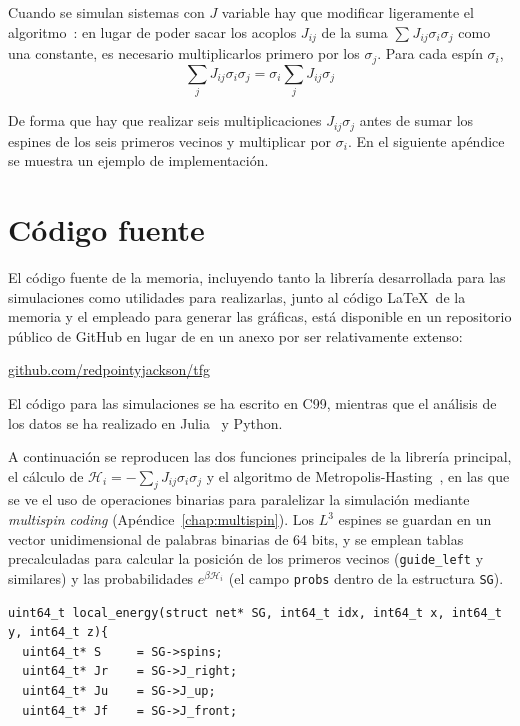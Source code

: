 \documentclass[11pt]{report}
\newcommand{\Ham}{\mathscr{H}}
\begin{document}
\begin{appendices}
Cuando se simulan sistemas con $J$ variable hay que modificar
ligeramente el algoritmo~\cite{multispincoding}: en lugar de poder
sacar los acoplos $J_{ij}$ de la suma $\sum_{} J_{ij}σ_iσ_j$ como una
constante, es necesario multiplicarlos primero por los $σ_j$. Para
cada espín $σ_i$,
\begin{equation}
  \sum_{j} J_{ij} σ_i σ_j = σ_i \sum_{j} J_{ij} σ_j
\end{equation}

De forma que hay que realizar seis multiplicaciones $J_{ij}σ_j$ antes
de sumar los espines de los seis primeros vecinos y multiplicar por
$σ_i$. En el siguiente apéndice se muestra un ejemplo de implementación.

\chapter{Código fuente}
El código fuente de la memoria, incluyendo tanto la librería
desarrollada para las simulaciones como utilidades para realizarlas,
junto al código \LaTeX \ de la memoria y el empleado para generar las
gráficas, está disponible en un repositorio público de GitHub
en lugar de en un anexo por ser relativamente extenso:
\begin{flushright}
  \url{github.com/redpointyjackson/tfg}
\end{flushright}

El código para las simulaciones se ha escrito en C99, mientras que el
análisis de los datos se ha realizado en Julia~\cite{julialang} y Python.

A continuación se reproducen las dos funciones principales de la
librería principal, el cálculo de $\Ham_i = -\sum_{j} J_{ij} σ_i σ_j$
y el algoritmo de Metropolis-Hasting~\cite{metropolis}, en las que se
ve el uso de operaciones binarias para paralelizar la simulación
mediante \textit{multispin coding} (Apéndice~\ref{chap:multispin}).
Los $L^3$ espines se guardan en un vector unidimensional de palabras
binarias de 64 bits, y se emplean tablas precalculadas para calcular
la posición de los primeros vecinos (\texttt{guide\_left} y similares)
y las probabilidades $e^{β \Ham_i}$ (el campo \texttt{probs} dentro de
la estructura \texttt{SG}).

\vspace{1cm}

\begin{verbatim}
uint64_t local_energy(struct net* SG, int64_t idx, int64_t x, int64_t y, int64_t z){
  uint64_t* S     = SG->spins;
  uint64_t* Jr    = SG->J_right;
  uint64_t* Ju    = SG->J_up;
  uint64_t* Jf    = SG->J_front;


\end{verbatim}
\end{appendices}
\end{document}
